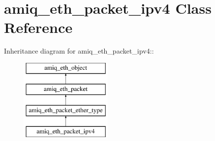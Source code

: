 \hypertarget{classamiq__eth__packet__ipv4}{
\section{amiq\_\-eth\_\-packet\_\-ipv4 Class Reference}
\label{classamiq__eth__packet__ipv4}
}
Inheritance diagram for amiq\_\-eth\_\-packet\_\-ipv4::\begin{figure}[H]
\begin{center}
\leavevmode
\includegraphics[height=4cm]{classamiq__eth__packet__ipv4}
\end{center}
\end{figure}
